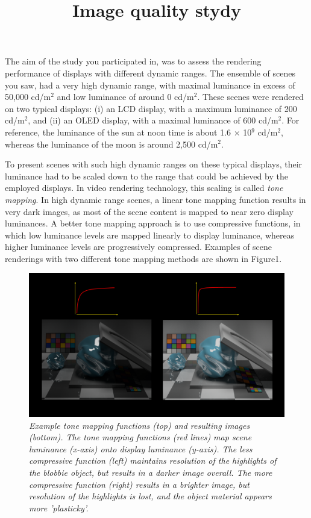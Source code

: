 \documentclass[11pt, oneside]{article}   	%
\title{\sffamily Image quality stydy}
\date{}							%
\begin{document}
\vspace{-0.5in}
\maketitle
\vspace{-0.5in}
\sffamily
The aim of the study you participated in, was to assess the rendering performance of displays with different dynamic ranges. The ensemble of scenes you saw, had a very high dynamic range, with maximal luminance in excess of 50,000 cd/m$^2$ and low luminance of around 0 cd/m$^2$. These scenes were rendered on two typical displays: (i) an LCD display, with a maximum luminance of 200 cd/m$^2$, and (ii) an OLED display, with a maximal luminance of 600 cd/m$^2$. For reference, the luminance of the sun at noon time is about 1.6 $\times$ 10$^9$ cd/m$^2$, whereas the luminance of the moon is around 2,500 cd/m$^2$.



To present scenes with such high dynamic ranges on these typical displays, their luminance had to be scaled down to the range that could be achieved by the employed displays. In video rendering technology, this scaling is called {\em tone mapping}. In high dynamic range scenes, a linear tone mapping function results in very dark images, as most of the scene content is mapped to near zero display luminances. A better tone mapping approach is to use compressive functions, in which low luminance levels are mapped linearly to display luminance, whereas higher luminance levels are progressively compressed. Examples of scene renderings with two different tone mapping methods are shown in Figure1.
 
 \begin{figure}[h] %
   \centering
   \includegraphics[width=7in]{ToneMappingExamples.png} 
   \caption{\sffamily \em Example tone mapping functions (top) and resulting images (bottom). The tone mapping functions (red lines) map scene luminance (x-axis) onto display luminance (y-axis). The less compressive function (left) maintains resolution of the highlights of the blobbie object, but results in a darker image overall. The more compressive function (right) results in a brighter image, but resolution of the highlights is lost, and the object material appears more 'plasticky'.}
   \label{fig:example}
\end{figure}
\end{document}
